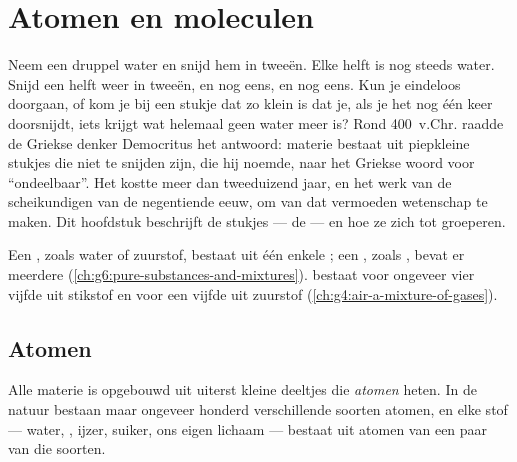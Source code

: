 \chapter{Atomen en moleculen}\label{ch:g7:atoms-and-molecules}

Neem een druppel water en snijd hem in tweeën. Elke helft is nog steeds
water. Snijd een helft weer in tweeën, en nog eens, en nog eens. Kun je
eindeloos doorgaan, of kom je bij een stukje dat zo klein is dat je, als
je het nog één keer doorsnijdt, iets krijgt wat helemaal geen water meer
is? Rond 400~v.Chr. raadde de Griekse denker Democritus het antwoord:
materie bestaat uit piepkleine stukjes die niet te snijden zijn, die hij
\emph{} noemde, naar het Griekse woord voor ``ondeelbaar''. Het
kostte meer dan tweeduizend jaar, en het werk van de scheikundigen van
de negentiende eeuw, om van dat vermoeden wetenschap te maken. Dit
hoofdstuk beschrijft de stukjes --- de  --- en hoe ze zich tot
 groeperen.

\begin{recall}
Een , zoals water of zuurstof, bestaat uit één enkele
; een , zoals , bevat er meerdere
(\cref{ch:g6:pure-substances-and-mixtures}).  bestaat voor ongeveer
vier vijfde uit stikstof en voor een vijfde uit zuurstof
(\cref{ch:g4:air-a-mixture-of-gases}).
\end{recall}

\section{Atomen}

\begin{definition}[Atoom]\label{def:g7:atoms-and-molecules:atom}
Alle materie is opgebouwd uit uiterst kleine deeltjes die
\emph{atomen} heten. In de natuur bestaan maar ongeveer
honderd verschillende soorten atomen, en elke stof --- water, ,
ijzer, suiker, ons eigen lichaam --- bestaat uit atomen van een paar van
die soorten.
\end{definition}

